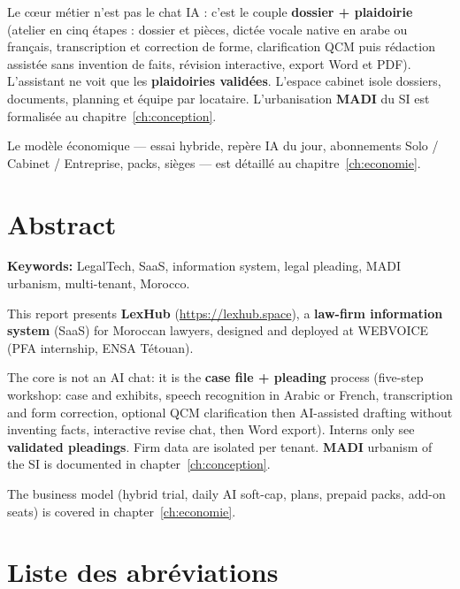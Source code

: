 Le cœur métier n'est pas le chat IA : c'est le couple \textbf{dossier + plaidoirie} (atelier en cinq étapes : dossier et pièces, dictée vocale native en arabe ou français, transcription et correction de forme, clarification QCM puis rédaction assistée sans invention de faits, révision interactive, export Word et PDF). L'assistant ne voit que les \textbf{plaidoiries validées}. L'espace cabinet isole dossiers, documents, planning et équipe par locataire. L'urbanisation \textbf{MADI} du SI est formalisée au chapitre~\ref{ch:conception}.

Le modèle économique --- essai hybride, repère IA du jour, abonnements Solo / Cabinet / Entreprise, packs, sièges --- est détaillé au chapitre~\ref{ch:economie}.

\chapter*{Abstract}

\textbf{Keywords:} LegalTech, SaaS, information system, legal pleading, MADI urbanism, multi-tenant, Morocco.

This report presents \textbf{LexHub} (\url{https://lexhub.space}), a \textbf{law-firm information system} (SaaS) for Moroccan lawyers, designed and deployed at WEBVOICE (PFA internship, ENSA Tétouan).

The core is not an AI chat: it is the \textbf{case file + pleading} process (five-step workshop: case and exhibits, speech recognition in Arabic or French, transcription and form correction, optional QCM clarification then AI-assisted drafting without inventing facts, interactive revise chat, then Word export). Interns only see \textbf{validated pleadings}. Firm data are isolated per tenant. \textbf{MADI} urbanism of the SI is documented in chapter~\ref{ch:conception}.

The business model (hybrid trial, daily AI soft-cap, plans, prepaid packs, add-on seats) is covered in chapter~\ref{ch:economie}.

\chapter*{Liste des abréviations}

